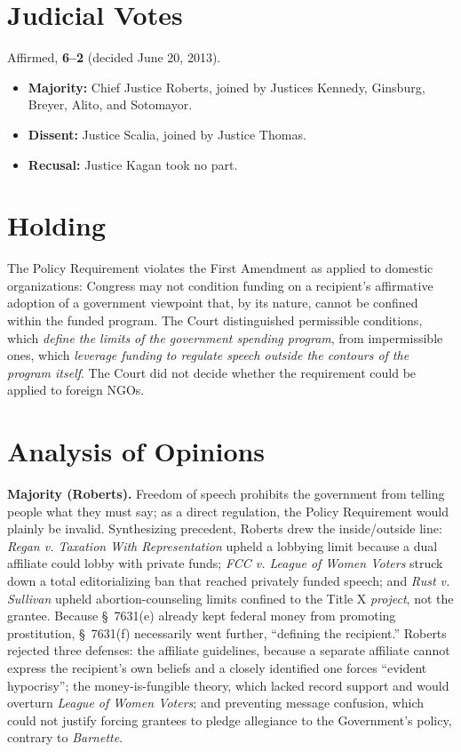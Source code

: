 \documentclass[12pt]{article}
\begin{document}
\section{Judicial Votes}

Affirmed, \textbf{6--2} (decided June 20, 2013).
\begin{itemize}
\item \textbf{Majority:} Chief Justice Roberts, joined by Justices Kennedy, Ginsburg, Breyer, Alito, and Sotomayor.
\item \textbf{Dissent:} Justice Scalia, joined by Justice Thomas.
\item \textbf{Recusal:} Justice Kagan took no part.
\end{itemize}

\section{Holding}

The Policy Requirement violates the First Amendment as applied to domestic organizations: Congress may not condition funding on a recipient's affirmative adoption of a government viewpoint that, by its nature, cannot be confined within the funded program. The Court distinguished permissible conditions, which \emph{define the limits of the government spending program}, from impermissible ones, which \emph{leverage funding to regulate speech outside the contours of the program itself}. The Court did not decide whether the requirement could be applied to foreign NGOs.

\section{Analysis of Opinions}

\textbf{Majority (Roberts).} Freedom of speech prohibits the government from telling people what they must say; as a direct regulation, the Policy Requirement would plainly be invalid. Synthesizing precedent, Roberts drew the inside/outside line: \textit{Regan v. Taxation With Representation} upheld a lobbying limit because a dual affiliate could lobby with private funds; \textit{FCC v. League of Women Voters} struck down a total editorializing ban that reached privately funded speech; and \textit{Rust v. Sullivan} upheld abortion-counseling limits confined to the Title X \emph{project}, not the grantee. Because \S~7631(e) already kept federal money from promoting prostitution, \S~7631(f) necessarily went further, ``defining the recipient.'' Roberts rejected three defenses: the affiliate guidelines, because a separate affiliate cannot express the recipient's own beliefs and a closely identified one forces ``evident hypocrisy''; the money-is-fungible theory, which lacked record support and would overturn \textit{League of Women Voters}; and preventing message confusion, which could not justify forcing grantees to pledge allegiance to the Government's policy, contrary to \textit{Barnette}.
\end{document}
